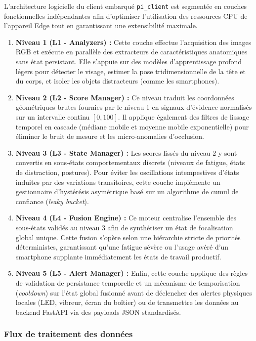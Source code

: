 L'architecture logicielle du client embarqué \texttt{pi\_client} est segmentée en couches fonctionnelles indépendantes afin d'optimiser l'utilisation des ressources CPU de l'appareil Edge tout en garantissant une extensibilité maximale.
\begin{enumerate}
    \item \textbf{Niveau 1 (L1 - Analyzers) :} Cette couche effectue l'acquisition des images RGB et exécute en parallèle des extracteurs de caractéristiques anatomiques sans état persistant. Elle s'appuie sur des modèles d'apprentissage profond légers pour détecter le visage, estimer la pose tridimensionnelle de la tête et du corps, et isoler les objets distracteurs (comme les smartphones).
    \item \textbf{Niveau 2 (L2 - Score Manager) :} Ce niveau traduit les coordonnées géométriques brutes fournies par le niveau 1 en signaux d'évidence normalisés sur un intervalle continu $[0, 100]$. Il applique également des filtres de lissage temporel en cascade (médiane mobile et moyenne mobile exponentielle) pour éliminer le bruit de mesure et les micro-anomalies d'occlusion.
    \item \textbf{Niveau 3 (L3 - State Manager) :} Les scores lissés du niveau 2 y sont convertis en sous-états comportementaux discrets (niveaux de fatigue, états de distraction, postures). Pour éviter les oscillations intempestives d'états induites par des variations transitoires, cette couche implémente un gestionnaire d'hystérésis asymétrique basé sur un algorithme de cumul de confiance (\textit{leaky bucket}).
    \item \textbf{Niveau 4 (L4 - Fusion Engine) :} Ce moteur centralise l'ensemble des sous-états validés au niveau 3 afin de synthétiser un état de focalisation global unique. Cette fusion s'opère selon une hiérarchie stricte de priorités déterministes, garantissant qu'une fatigue sévère ou l'usage avéré d'un smartphone supplante immédiatement les états de travail productif.
    \item \textbf{Niveau 5 (L5 - Alert Manager) :} Enfin, cette couche applique des règles de validation de persistance temporelle et un mécanisme de temporisation (\textit{cooldown}) sur l'état global fusionné avant de déclencher des alertes physiques locales (LED, vibreur, écran du boîtier) ou de transmettre les données au backend FastAPI via des payloads JSON standardisés.
\end{enumerate}

\subsubsection{Flux de traitement des données}

